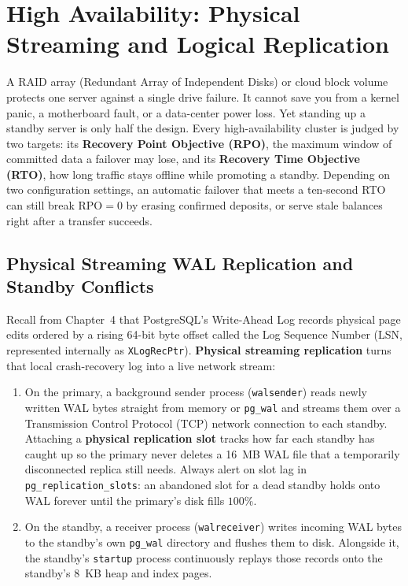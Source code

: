 \section{High Availability: Physical Streaming and Logical Replication}
\label{ch08:replication}

A RAID array (Redundant Array of Independent Disks) or cloud block volume protects one server against a single drive
failure. It cannot save you from a kernel panic, a motherboard fault, or a
data-center power loss. Yet standing up a standby server is only half the
design. Every high-availability cluster is judged by two targets: its
\textbf{Recovery Point Objective (RPO)}, the maximum window of committed data a
failover may lose, and its \textbf{Recovery Time Objective (RTO)}, how long
traffic stays offline while promoting a standby. Depending on two configuration
settings, an automatic failover that meets a ten-second RTO can still break
$\text{RPO} = 0$ by erasing confirmed deposits, or serve stale balances right
after a transfer succeeds.

\subsection{Physical Streaming WAL Replication and Standby Conflicts}
\label{ch08:physical-replication}

Recall from Chapter~4 that PostgreSQL's Write-Ahead Log records physical page
edits ordered by a rising 64-bit byte offset called the Log Sequence Number (LSN,
represented internally as \texttt{XLogRecPtr}). \textbf{Physical streaming
replication} turns that local crash-recovery log into a live network stream:

\begin{enumerate}
  \item On the primary, a background sender process (\texttt{walsender}) reads
    newly written WAL bytes straight from memory or \texttt{pg\_wal} and streams
    them over a Transmission Control Protocol (TCP) network connection to each standby. Attaching a \textbf{physical replication slot}
    tracks how far each standby has caught up so the primary never deletes a 16~MB
    WAL file that a temporarily disconnected replica still needs. Always alert on
    slot lag in \texttt{pg\_replication\_slots}: an abandoned slot for a dead
    standby holds onto WAL forever until the primary's disk fills $100\%$.
  \item On the standby, a receiver process (\texttt{walreceiver}) writes incoming
    WAL bytes to the standby's own \texttt{pg\_wal} directory and flushes them to
    disk. Alongside it, the standby's \texttt{startup} process continuously replays
    those records onto the standby's 8~KB heap and index pages.
\end{enumerate}

